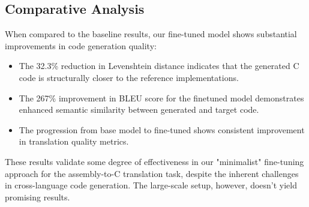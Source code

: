 \documentclass[../main.tex]{subfiles}
\begin{document}
\subsection{Comparative Analysis}

When compared to the baseline results, our fine-tuned model shows substantial improvements in code generation quality:

\begin{itemize}
\item The 32.3\% reduction in Levenshtein distance indicates that the generated C code is structurally closer to the reference implementations.
\item The 267\% improvement in BLEU score for the finetuned model demonstrates enhanced semantic similarity between generated and target code.
\item The progression from base model to fine-tuned shows consistent improvement in translation quality metrics.
\end{itemize}

These results validate some degree of effectiveness in our "minimalist" fine-tuning approach for the assembly-to-C translation task, despite the inherent challenges in cross-language code generation.
The large-scale setup, however, doesn't yield promising results.
\end{document}
